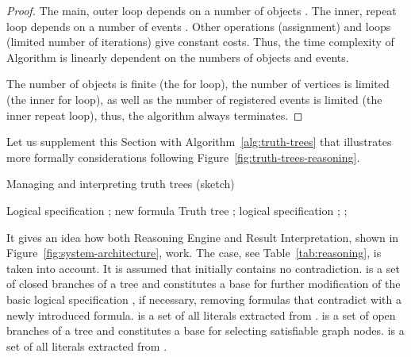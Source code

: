 \documentclass[runningheads,a4paper]{llncs}
\begin{document}
\begin{proof}
The main, outer loop depends on a number of objects .
The inner, repeat loop depends on a number of events .
Other operations (assignment) and loops (limited number of iterations) give constant costs.
Thus, the time complexity of Algorithm is linearly dependent on the numbers of objects and events.

The number of objects is finite (the for loop),
the number of vertices is limited (the inner for loop),
as well as the number of registered events is limited (the inner repeat loop),
thus, the algorithm always terminates.
\end{proof}

Let us supplement this Section with Algorithm~\ref{alg:truth-trees}
that illustrates more formally considerations following Figure~\ref{fig:truth-trees-reasoning}.
\begin{algorithm}[htb]
\caption{Managing and interpreting truth trees (sketch)}
\label{alg:truth-trees}
{\normalsize
\begin{algorithmic}[1]
\algrenewcommand{}
\algrenewcommand{}
\Require Logical specification ; new formula 
\Ensure Truth tree ; logical specification ; ;
\label{alg:remove-s}
\State{}\label{alg:remove-e}
\label{alg:action}
\end{algorithmic}
}
\end{algorithm}
It gives an idea how both Reasoning Engine and Result Interpretation,
shown in Figure~\ref{fig:system-architecture},
work.
The  case,
see Table~\ref{tab:reasoning},
is taken into account.
It is assumed that initially  contains no contradiction.
 is a set of closed branches of a tree and constitutes a base for further modification of
the basic logical specification ,
if necessary,
removing formulas that contradict with a newly introduced formula.
 is a set of all literals extracted from .
 is a set of open branches of a tree and constitutes a base for selecting satisfiable graph nodes.
 is a set of all literals extracted from .
\end{document}
